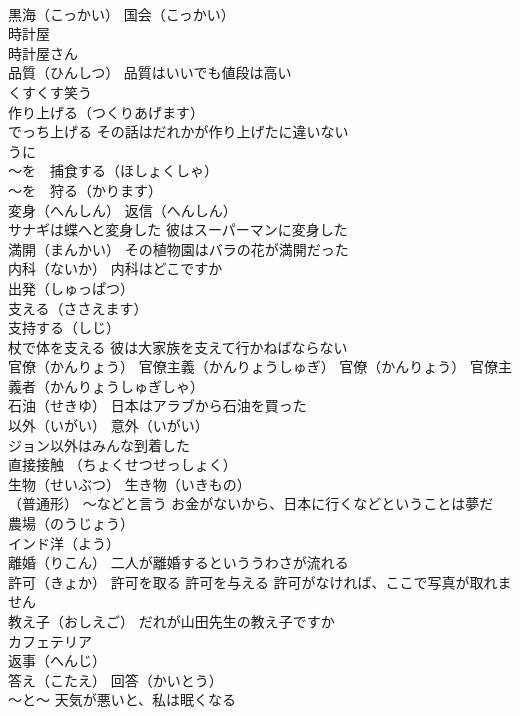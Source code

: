\documentclass[8pt]{extreport}
\begin{document}
\begin{CJK}{UTF8}{min}
\\	黒海（こっかい） 国会（こっかい）
\\	時計屋 
\\	時計屋さん 
\\	品質（ひんしつ） 品質はいいでも値段は高い
\\	くすくす笑う
\\	作り上げる（つくりあげます） 
\\	でっち上げる その話はだれかが作り上げたに違いない
\\	うに
\\	～を　捕食する（ほしょくしゃ）　
\\	～を　狩る（かります）
\\	変身（へんしん） 返信（へんしん）
\\	サナギは蝶へと変身した 彼はスーパーマンに変身した
\\	満開（まんかい） その植物園はバラの花が満開だった
\\	内科（ないか） 内科はどこですか
\\	出発（しゅっぱつ）
\\	支える（ささえます）
\\	支持する（しじ） 
\\	杖で体を支える 彼は大家族を支えて行かねばならない
\\	官僚（かんりょう） 官僚主義（かんりょうしゅぎ） 官僚（かんりょう） 官僚主義者（かんりょうしゅぎしゃ）
\\	石油（せきゆ） 日本はアラブから石油を買った
\\	以外（いがい） 意外（いがい）
\\	ジョン以外はみんな到着した
\\	直接接触 （ちょくせつせっしょく）
\\	生物（せいぶつ） 生き物（いきもの）
\\	（普通形） ～などと言う お金がないから、日本に行くなどということは夢だ
\\	農場（のうじょう）
\\	インド洋（よう）
\\	離婚（りこん） 二人が離婚するといううわさが流れる
\\	許可（きょか） 許可を取る 許可を与える 許可がなければ、ここで写真が取れません
\\	教え子（おしえご） だれが山田先生の教え子ですか
\\	カフェテリア
\\	返事（へんじ） 
\\	答え（こたえ） 回答（かいとう）
\\	～と～ 天気が悪いと、私は眠くなる

\end{CJK}
\end{document}
